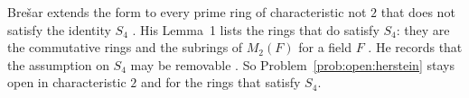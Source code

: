 Bre\v{s}ar extends the form to every prime ring of characteristic not $2$ that
does not satisfy the identity $S_4$
\cite[Theorem~5, p.~529]{Bresar1993LieTAMS}. His Lemma~1 lists the rings that
do satisfy $S_4$: they are the commutative rings and the subrings of
$M_2(F)$ for a field $F$ \cite[Lemma~1, p.~530]{Bresar1993LieTAMS}. He records
that the assumption on $S_4$ may be removable \cite[p.~528]{Bresar1993LieTAMS}.
So Problem~\ref{prob:open:herstein} stays open in characteristic $2$ and for the
rings that satisfy $S_4$.

